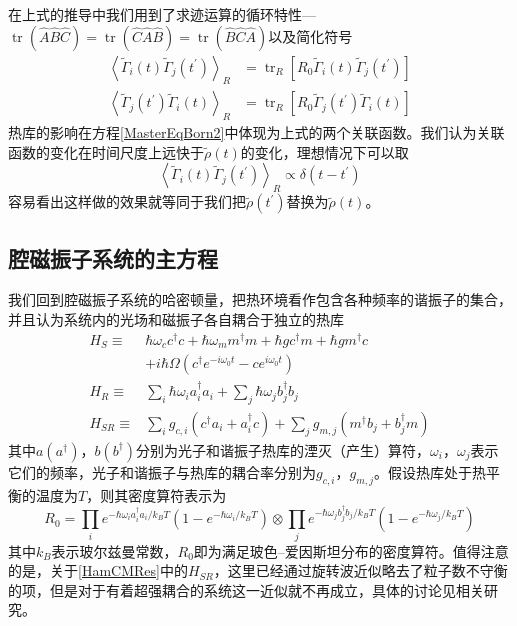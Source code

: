 在上式的推导中我们用到了求迹运算的循环特性---$\operatorname{tr}\left( \hat{A} \hat{B} \hat{C} \right)=\operatorname{tr}\left(\hat{C} \hat{A} \hat{B} \right)= \operatorname{tr} \left( \hat{B} \hat{C} \hat{A} \right)$以及简化符号
\begin{equation}
\begin{aligned}
\left\langle\tilde{\Gamma}_{i}(t) \tilde{\Gamma}_{j}\left(t^{\prime}\right)\right\rangle_{R} &=\operatorname{tr}_{R}\left[R_{0} \tilde{\Gamma}_{i}(t) \tilde{\Gamma}_{j}\left(t^{\prime}\right)\right] \\
\left\langle\tilde{\Gamma}_{j}\left(t^{\prime}\right) \tilde{\Gamma}_{i}(t)\right\rangle_{R} &=\operatorname{tr}_{R}\left[R_{0} \tilde{\Gamma}_{j}\left(t^{\prime}\right) \tilde{\Gamma}_{i}(t)\right]
\end{aligned}
\end{equation}
热库的影响在方程\eqref{MasterEqBorn2}中体现为上式的两个关联函数。我们认为关联函数的变化在时间尺度上远快于$\tilde{\rho}(t)$的变化，理想情况下可以取
\begin{equation}
\left\langle\tilde{\Gamma}_{i}(t) \tilde{\Gamma}_{j}\left(t^{\prime}\right)\right\rangle_{R} \propto \delta\left(t-t^{\prime}\right)
\end{equation}
容易看出这样做的效果就等同于我们把$\tilde{\rho}(t^{\prime})$替换为$\tilde{\rho}(t)$。

\subsection{腔磁振子系统的主方程}
我们回到腔磁振子系统的哈密顿量，把热环境看作包含各种频率的谐振子的集合，并且认为系统内的光场和磁振子各自耦合于独立的热库
\begin{equation}
\begin{aligned}
H_S\equiv{}&\hbar\omega_{c}c^{\dag}c+\hbar\omega_{m}m^{\dag}m+\hbar gc^{\dag}m+\hbar gm^{\dag}c \\
&+i\hbar\Omega(c^{\dag}e^{-i\omega_{0}t}-ce^{i\omega_{0}t}) \\
H_{R}\equiv&\sum_{i}\hbar\omega_{i}a_{i}^{\dag}a_{i}+\sum_{j}\hbar\omega_{j}b_{j}^{\dag}b_{j} \\
H_{SR}\equiv&\sum_{i}g_{c,i}(c^{\dag}a_{i}+a_{i}^{\dag}c)+\sum_{j}g_{m,j}(m^{\dag}b_{j}+b_{j}^{\dag}m)
\label{HamCMRes}
\end{aligned}
\end{equation}
其中$a(a^{\dag})$，$b(b^{\dag})$分别为光子和谐振子热库的湮灭（产生）算符，$\omega_{i}$，$\omega_{j}$表示它们的频率，光子和谐振子与热库的耦合率分别为$g_{c,i}$，$g_{m,j}$。假设热库处于热平衡的温度为$T$，则其密度算符表示为
\begin{equation}
R_{0}=\prod_{i} e^{-\hbar \omega_{i} a_{i}^{\dag}a_{i} / k_{B} T}\left(1-e^{-\hbar \omega_{i} / k_{B} T}\right) \otimes \prod_{j} e^{-\hbar \omega_{j} b_{j}^{\dag}b_{j} / k_{B} T}\left(1-e^{-\hbar \omega_{j} / k_{B} T}\right)
\label{ThermalState}
\end{equation}
其中$k_{B}$表示玻尔兹曼常数，$R_{0}$即为满足玻色--爱因斯坦分布的密度算符。值得注意的是，关于\eqref{HamCMRes}中的$H_{SR}$，这里已经通过旋转波近似略去了粒子数不守衡的项，但是对于有着超强耦合的系统这一近似就不再成立，具体的讨论见相关研究\cite{}。

